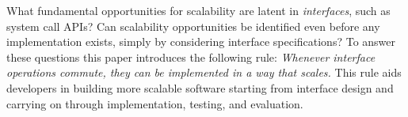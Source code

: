 %
%
%
What fundamental opportunities for scalability are latent in
\emph{interfaces}, such as system call APIs? Can scalability
opportunities be identified even before any implementation exists,
simply by considering interface specifications?
%
%
To answer these
questions this paper introduces the following rule:
%
\emph{Whenever interface operations commute,
they can be implemented in a way that scales.}
%
%
%
%
This rule aids developers in building more scalable software starting from
interface design and
carrying on through implementation, testing, and evaluation.

